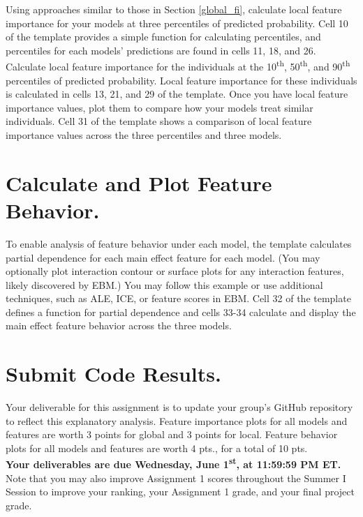 \documentclass[fleqn]{article}
\begin{document}
Using approaches similar to those in Section \ref{global_fi}, calculate local feature importance for your models at three percentiles of predicted probability. Cell 10 of the template provides a simple function for calculating percentiles, and percentiles for each models' predictions are found in cells 11, 18, and 26.\\

\noindent Calculate local feature importance for the individuals at the 10\textsuperscript{th}, 50\textsuperscript{th}, and 90\textsuperscript{th} percentiles of predicted probability. Local feature importance for these individuals is calculated in cells 13, 21, and 29 of the template. Once you have local feature importance values, plot them to compare how your models treat similar individuals. Cell 31 of the template shows a comparison of local feature importance values across the three percentiles and three models.

\section{Calculate and Plot Feature Behavior.}

To enable analysis of feature behavior under each model, the template calculates partial dependence for each main effect feature for each model. (You may optionally plot interaction contour or surface plots for any interaction features, likely discovered by EBM.) You may follow this example or use additional techniques, such as ALE, ICE, or feature scores in EBM. Cell 32 of the template defines a function for partial dependence and cells 33-34 calculate and display the main effect feature behavior across the three models. 

\section{Submit Code Results.}

Your deliverable for this assignment is to update your group's GitHub repository to reflect this explanatory analysis. Feature importance plots for all models and features are worth 3 points for global and 3 points for local. Feature behavior plots for all models and features are worth 4 pts., for a total of 10 pts.\\

\noindent \textbf{Your deliverables are due Wednesday, June 1\textsuperscript{st}, at 11:59:59 PM ET.}\\

\noindent Note that you may also improve Assignment 1 scores throughout the Summer I Session to improve your ranking, your Assignment 1 grade, and your final project grade.
\end{document}
